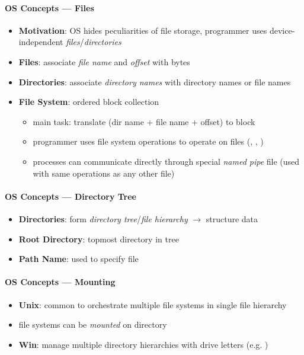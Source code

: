 \paragraph{OS Concepts --- Files}
\begin{itemize}
	\item \textbf{Motivation}: OS hides peculiarities of file storage, programmer uses device-independent \emph{files}/\emph{directories}
	\item \textbf{Files}: associate \emph{file name} and \emph{offset} with bytes
	\item \textbf{Directories}: associate \emph{directory names} with directory names or file names
	\item \textbf{File System}: ordered block collection
	\begin{itemize}
		\item main task: translate (dir name + file name + offset) to block
		\item programmer uses file system operations to operate on files (, , )
		\item processes can communicate directly through special \emph{named pipe} file (used with same operations as any other file)
	\end{itemize}
\end{itemize}

\paragraph{OS Concepts --- Directory Tree}
\begin{itemize}
	\item \textbf{Directories}: form \emph{directory tree}/\emph{file hierarchy}
		$ \to $ structure data
	\item \textbf{Root Directory}: topmost directory in tree
	\item \textbf{Path Name}: used to specify file
\end{itemize}

\paragraph{OS Concepts --- Mounting}
\begin{itemize}
	\item \textbf{Unix}: common to orchestrate multiple file systems in single file hierarchy
	\item file systems can be \emph{mounted} on directory
	\item \textbf{Win}: manage multiple directory hierarchies with drive letters (e.g. )
\end{itemize}

